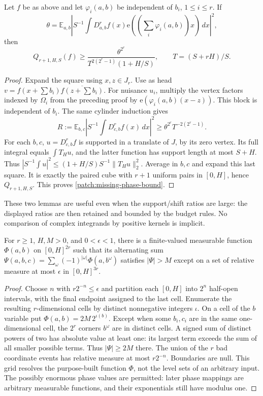 \documentclass[11pt]{article}
\theoremstyle{definition}
\newcommand{\ee}[1]{\mathrm e\!\left(#1\right)}
\begin{document}
\begin{lemma}\label{patch:missing-phase}
Let $f$ be as above and let $\varphi_i(a,b)$ be independent of $b_i$, $1\leq i\leq r$.
If
\[
 \theta=\mathbb E_{a,b}
       \left|S^{-1}\int D_{a,b}^{r}f(x)\ee{(\sum_i\varphi_i(a,b))x}\,dx\right|^2,
\]
then
\[
 \label{patch:missing-phase-bound}
 Q_{r+1,H,S}(f)\geq
       \frac{\theta^{2^r}}{T^{2(2^r-1)}(1+H/S)},\qquad T=(S+rH)/S.
 \tag{\theequation}
\]
\end{lemma}
\begin{proof}
Expand the square using $x,z\in J_r$.
Use as head $v=f(x+\sum b_i)\overline{f(z+\sum b_i)}$.
For nuisance $u_i$, multiply the vertex factors indexed by $\Omega_i$ from the preceding
proof by $\ee{\varphi_i(a,b)(x-z)}$.  This block is independent of $b_i$.
The same cylinder induction gives
\[
 R:=\mathbb E_{b,c}\left|S^{-1}\int D_{c,b}^{r}f(x)\,dx\right|^2
       \geq\theta^{2^r}T^{-2(2^r-1)}.
\]
For each $b,c$, $u=D_{c,b}^{r}f$ is supported in a translate of $J$, by its zero vertex.
Its full integral equals $\int T_Hu$, and the latter function has support length at most $S+H$.
Thus $|S^{-1}\int u|^2\leq(1+H/S)S^{-1}\|T_Hu\|_2^2$.
Average in $b,c$ and expand this last square.  It is exactly the paired cube with $r+1$
uniform pairs in $[0,H]$, hence $Q_{r+1,H,S}$.  This proves \eqref{patch:missing-phase-bound}.
\end{proof}
These two lemmas are useful even when the support/shift ratios are large: the displayed
ratios are then retained and bounded by the budget rules.  No comparison of complex
integrands by positive kernels is implicit.

\begin{lemma}\label{patch:dummy-phase}
For $r\geq1$, $H,M>0$, and $0<\epsilon<1$, there is a finite-valued measurable function
$\Phi(a,b)$ on $[0,H]^{2r}$ such that its alternating sum
$\Psi(a,b,c)=\sum_\omega(-1)^{|\omega|}\Phi(a,b^\omega)$ satisfies $|\Psi|>M$ except on
a set of relative measure at most $\epsilon$ in $[0,H]^{3r}$.
\end{lemma}
\begin{proof}
Choose $n$ with $r2^{-n}\leq\epsilon$ and partition each $[0,H]$ into $2^n$ half-open
intervals, with the final endpoint assigned to the last cell.
Enumerate the resulting $r$-dimensional cells by distinct nonnegative integers $\iota$.
On a cell of the $b$ variable put $\Phi(a,b)=2M\,2^{\iota(b)}$.
Except when some $b_i,c_i$ are in the same one-dimensional cell, the $2^r$ corners $b^\omega$
are in distinct cells.  A signed sum of distinct powers of two has absolute value at least
one: its largest term exceeds the sum of all smaller possible terms.
Thus $|\Psi|\geq2M$ there.  The union of the $r$ bad coordinate events has relative measure
at most $r2^{-n}$.  Boundaries are null.  This grid resolves the purpose-built function
$\Phi$, not the level sets of an arbitrary input.  The possibly enormous phase values are
permitted: later phase mappings are arbitrary measurable functions, and their exponentials
still have modulus one.
\end{proof}
\end{document}
